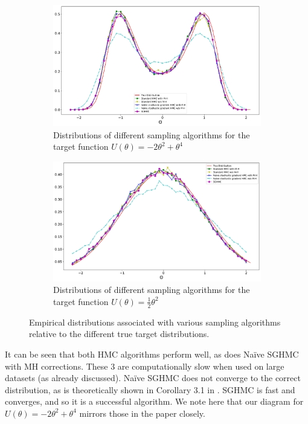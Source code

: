 \begin{figure}[h!]
\begin{subfigure}{.5\textwidth}
\includegraphics[width=.9\linewidth]{parts/Images/fig1a.pdf}
\caption{Distributions of different sampling algorithms for the target function $U(\theta) = -2\theta^2 + \theta^4$}
\label{fig1a}
\end{subfigure}%
\begin{subfigure}{.5\textwidth}
\includegraphics[width=.9\linewidth]{parts/Images/fig1b.pdf}
\caption{Distributions of different sampling algorithms for the target function $U(\theta) = \frac{1}{2}\theta^2$}
\label{fig1b}
\end{subfigure}
\caption{Empirical distributions associated with various sampling algorithms relative to the different true target distributions.}
\label{fig:demo}
\end{figure}



It can be seen that both HMC algorithms perform well, as does Naïve SGHMC with MH corrections. These 3 are computationally slow when used on large datasets (as already discussed). Naïve SGHMC does not converge to the correct distribution, as is theoretically shown in Corollary 3.1 in \cite{sghmc}. SGHMC is fast and converges, and so it is a successful algorithm. We note here that our diagram for $U(\theta) = -2\theta^2 + \theta^4$ mirrors those in the paper closely.

